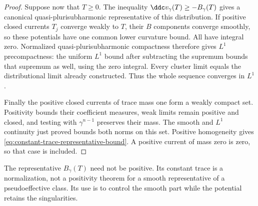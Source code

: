 \begin{proof}
Suppose now that $T\geq0$. The inequality $\ddc v_\gamma(T)\geq-B_\gamma(T)$ gives a canonical quasi-plurisubharmonic representative of this distribution. If positive closed currents $T_j$ converge weakly to $T$, their $B$ components converge smoothly, so these potentials have one common lower curvature bound. All have integral zero. Normalized quasi-plurisubharmonic compactness therefore gives $L^1$ precompactness: the uniform $L^1$ bound after subtracting the supremum bounds that supremum as well, using the zero integral. Every cluster limit equals the distributional limit already constructed. Thus the whole sequence converges in $L^1$.

Finally the positive closed currents of trace mass one form a weakly compact set. Positivity bounds their coefficient measures, weak limits remain positive and closed, and testing with $\gamma^{n-1}$ preserves their mass. The smooth and $L^1$ continuity just proved bounds both norms on this set. Positive homogeneity gives \eqref{eq:constant-trace-representative-bound}. A positive current of mass zero is zero, so that case is included.
\end{proof}

The representative $B_\gamma(T)$ need not be positive. Its constant trace is a normalization, not a positivity theorem for a smooth representative of a pseudoeffective class. Its use is to control the smooth part while the potential retains the singularities.

